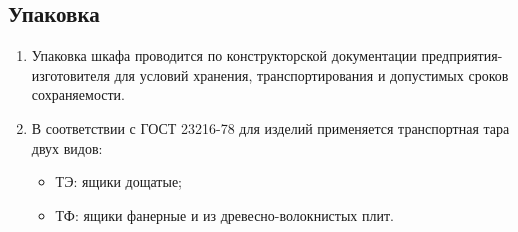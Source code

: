 \color{unidarkgreen}\subsection{Упаковка}\color{black}

\begin{enumerate}[label=\arabic{section}.\arabic{subsection}.\arabic*, align=left, labelsep=4pt, leftmargin=0pt, itemindent=2cm]

\item
Упаковка шкафа проводится по конструкторской документации предприятия-изготовителя для условий хранения, транспортирования и допустимых сроков сохраняемости.

\item
В соответствии с ГОСТ 23216-78 для изделий применяется транспортная тара двух видов:
\begin{itemize}
\item ТЭ: ящики дощатые;
\item ТФ: ящики фанерные и из древесно-волокнистых плит.
\end{itemize}

\end{enumerate}
